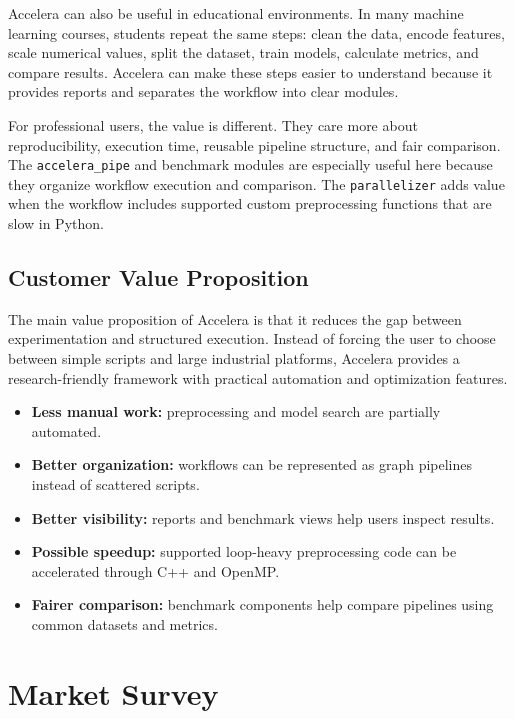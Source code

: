 \documentclass[12pt,a4paper]{report}
\begin{document}
\medskip
\noindent Accelera can also be useful in educational environments. In many machine
learning courses, students repeat the same steps: clean the data, encode
features, scale numerical values, split the dataset, train models, calculate
metrics, and compare results. Accelera can make these steps easier to understand
because it provides reports and separates the workflow into clear modules.

\medskip
\noindent For professional users, the value is different. They care more about
reproducibility, execution time, reusable pipeline structure, and fair
comparison. The \texttt{accelera\_pipe} and benchmark modules are especially
useful here because they organize workflow execution and comparison. The
\texttt{parallelizer} adds value when the workflow includes supported custom
preprocessing functions that are slow in Python.

\subsection*{Customer Value Proposition}

The main value proposition of Accelera is that it reduces the gap between
experimentation and structured execution. Instead of forcing the user to choose
between simple scripts and large industrial platforms, Accelera provides a
research-friendly framework with practical automation and optimization features.

\begin{itemize}
  \item \textbf{Less manual work:} preprocessing and model search are partially
  automated.
  \item \textbf{Better organization:} workflows can be represented as graph
  pipelines instead of scattered scripts.
  \item \textbf{Better visibility:} reports and benchmark views help users
  inspect results.
  \item \textbf{Possible speedup:} supported loop-heavy preprocessing code can be
  accelerated through C++ and OpenMP.
  \item \textbf{Fairer comparison:} benchmark components help compare pipelines
  using common datasets and metrics.
\end{itemize}

\section{Market Survey}
\end{document}
